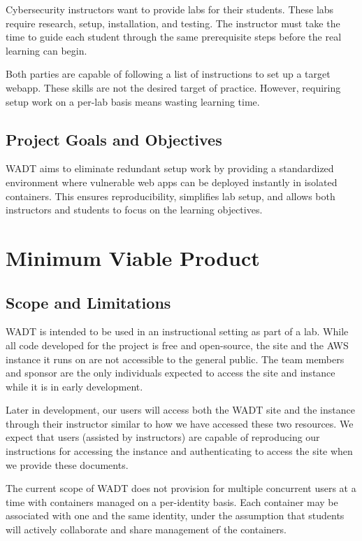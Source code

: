 \documentclass[12pt]{article}
\begin{document}
Cybersecurity instructors want to provide labs for their students. These labs require research, setup, installation, and testing. The instructor must take the time to guide each student through the same prerequisite steps before the real learning can begin.

Both parties are capable of following a list of instructions to set up a target webapp. These skills are not the desired target of practice. However, requiring setup work on a per-lab basis means wasting learning time.

\subsection{Project Goals and Objectives}
WADT aims to eliminate redundant setup work by providing a standardized environment where vulnerable web apps can be deployed instantly in isolated containers. This ensures reproducibility, simplifies lab setup, and allows both instructors and students to focus on the learning objectives.

\section{Minimum Viable Product}

\subsection{Scope and Limitations}
WADT is intended to be used in an instructional setting as part of a lab. While all code developed for the project is free and open-source, the site and the AWS instance it runs on are not accessible to the general public. The team members and sponsor are the only individuals expected to access the site and instance while it is in early development.

Later in development, our users will access both the WADT site and the instance through their instructor similar to how we have accessed these two resources. We expect that users (assisted by instructors) are capable of reproducing our instructions for accessing the instance and authenticating to access the site when we provide these documents.

The current scope of WADT does not provision for multiple concurrent users at a time with containers managed on a per-identity basis. Each container may be associated with one and the same identity, under the assumption that students will actively collaborate and share management of the containers.
\end{document}
